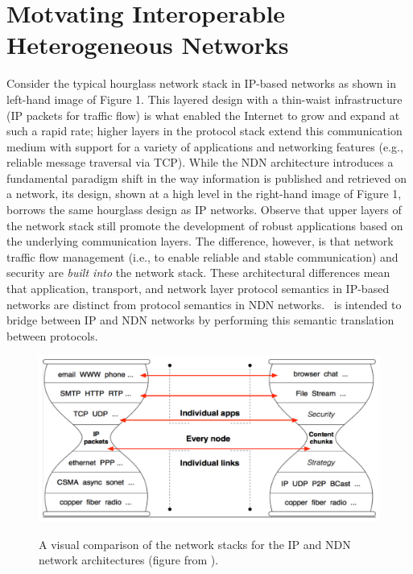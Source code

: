 \section{Motvating Interoperable Heterogeneous Networks}
Consider the typical hourglass network stack in IP-based networks as shown in left-hand image of Figure 1. This layered design with a thin-waist infrastructure (IP packets for traffic flow) is what enabled the Internet to grow and expand at such a rapid rate; higher layers in the protocol stack extend this communication medium with support for a variety of applications and networking features (e.g., reliable message traversal via TCP). While the NDN architecture introduces a fundamental paradigm shift in the way information is published and retrieved on a network, its design, shown at a high level in the right-hand image of Figure 1, borrows the same hourglass design as IP networks. Observe that upper layers of the network stack still promote the development of robust applications based on the underlying communication layers. The difference, however, is that network traffic flow management (i.e., to enable reliable and stable communication) and security are \emph{built into} the network stack. These architectural differences mean that application, transport, and network layer protocol semantics in IP-based networks are distinct from protocol semantics in NDN networks. \sink\ is intended to bridge between IP and NDN networks by performing this semantic translation between protocols. 

\begin{figure}[ht!]
\begin{center}
\includegraphics[scale=0.32]{./images/hourglass_conn.pdf}
\label{fig:hourglass}
\caption{A visual comparison of the network stacks for the IP and NDN network architectures (figure from \cite{ndn-techreport}).}
\end{center}
\end{figure}

